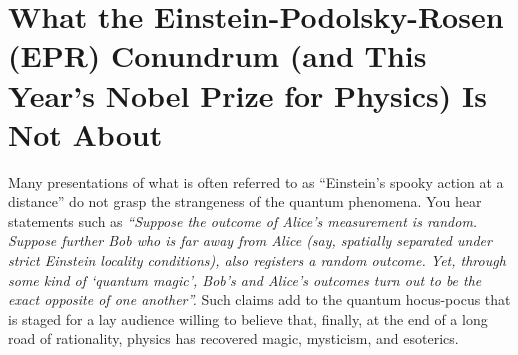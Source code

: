 \documentclass[entropy,article,accept,oneauthor,pdftex]{Definitions/mdpi}
\begin{document}

\section{What the Einstein-Podolsky-Rosen (EPR) Conundrum (and This Year’s Nobel Prize for Physics) Is Not About}



Many presentations of what is often referred to as ``Einstein's spooky action at a distance'' do not grasp the strangeness of the quantum phenomena.
You hear statements such as {\it
``Suppose the outcome of Alice's measurement is random.
Suppose further Bob who is far away from Alice
(say, spatially separated under strict Einstein locality conditions),
also registers a random outcome.
Yet, through some kind of `quantum magic', Bob's and Alice's outcomes turn out to be the exact opposite of one another''.}
Such claims add to the quantum hocus-pocus that is staged for a lay audience willing to believe that, finally,
at the end of a long road of rationality, physics has recovered magic, mysticism, and esoterics.
\end{document}
